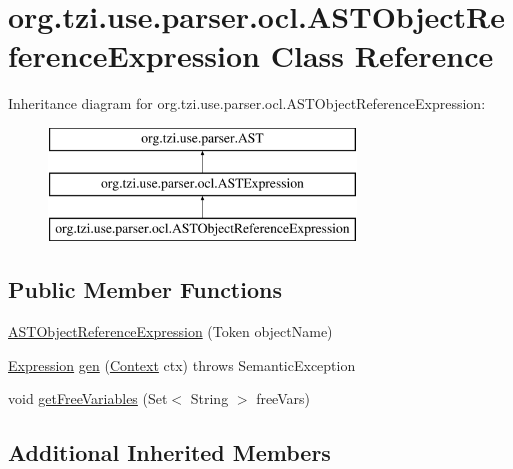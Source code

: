 \hypertarget{classorg_1_1tzi_1_1use_1_1parser_1_1ocl_1_1_a_s_t_object_reference_expression}{\section{org.\-tzi.\-use.\-parser.\-ocl.\-A\-S\-T\-Object\-Reference\-Expression Class Reference}
\label{classorg_1_1tzi_1_1use_1_1parser_1_1ocl_1_1_a_s_t_object_reference_expression}
}
Inheritance diagram for org.\-tzi.\-use.\-parser.\-ocl.\-A\-S\-T\-Object\-Reference\-Expression\-:\begin{figure}[H]
\begin{center}
\leavevmode
\includegraphics[height=3.000000cm]{classorg_1_1tzi_1_1use_1_1parser_1_1ocl_1_1_a_s_t_object_reference_expression}
\end{center}
\end{figure}
\subsection*{Public Member Functions}
\begin{DoxyCompactItemize}
\item 
\hyperlink{classorg_1_1tzi_1_1use_1_1parser_1_1ocl_1_1_a_s_t_object_reference_expression_a30ddd25a5376accc48fa7bad11fbda53}{A\-S\-T\-Object\-Reference\-Expression} (Token object\-Name)
\item 
\hyperlink{classorg_1_1tzi_1_1use_1_1uml_1_1ocl_1_1expr_1_1_expression}{Expression} \hyperlink{classorg_1_1tzi_1_1use_1_1parser_1_1ocl_1_1_a_s_t_object_reference_expression_af4d172df0981b616c81cfe0e92688243}{gen} (\hyperlink{classorg_1_1tzi_1_1use_1_1parser_1_1_context}{Context} ctx)  throws Semantic\-Exception 
\item 
void \hyperlink{classorg_1_1tzi_1_1use_1_1parser_1_1ocl_1_1_a_s_t_object_reference_expression_a7bc375d1c1f8586617f151db8d672980}{get\-Free\-Variables} (Set$<$ String $>$ free\-Vars)
\end{DoxyCompactItemize}
\subsection*{Additional Inherited Members}


